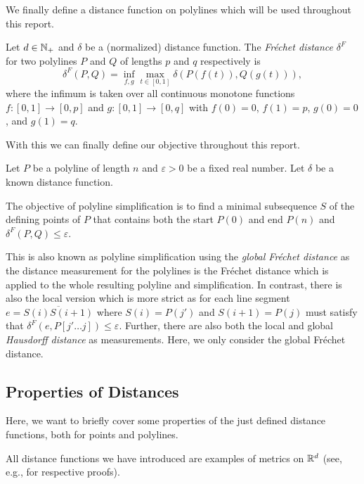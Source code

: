 We finally define a distance function on polylines which will be used throughout this report. 

\begin{definition}
  Let \(d \in \mathbb{N}_+\) and \(\delta\) be a (normalized) distance function. The \emph{Fréchet distance} \(\delta^F\) for two polylines \(P\) and \(Q\) of lengths \(p\) and \(q\) respectively is 
  \[\delta^F(P, Q) = \inf_{f,g} \max_{t \in [0,1]}\delta(P(f(t)), Q(g(t))),\]
  where the infimum is taken over all continuous monotone functions \(f:[0,1] \to [0, p]\) and \(g:[0,1] \to [0,q]\) with \(f(0) = 0\), \(f(1) = p\), \(g(0) = 0\), and \(g(1) = q\).
\end{definition}

With this we can finally define our objective throughout this report. 

\begin{definition}
  Let \(P\) be a polyline of length \(n\) and \(\varepsilon > 0\) be a fixed real number. Let \(\delta\) be a known distance function. 

  The objective of polyline simplification is to find a minimal subsequence \(S\) of the defining points of \(P\) that contains both the start \(P(0)\) and end \(P(n)\) and \(\delta^F(P, Q) \leq \varepsilon\).
\end{definition}

This is also known as polyline simplification using the \emph{global Fréchet distance} as the distance measurement for the polylines is the Fréchet distance which is applied to the whole resulting polyline and simplification. In contrast, there is also the local version which is more strict as for each line segment \(e = \overline{S(i)S(i+1)}\) where \(S(i) = P(j')\) and \(S(i+1) = P(j)\) must satisfy that \(\delta^F(e, P[j' \dots j]) \leq \varepsilon\). Further, there are also both the local and global \emph{Hausdorff distance} as measurements. Here, we only consider the global Fréchet distance.

\subsection{Properties of Distances}
Here, we want to briefly cover some properties of the just defined distance functions, both for points and polylines.

All distance functions we have introduced are examples of metrics on \(\mathbb{R}^d\) (see, e.g., \cite{metric_spaces} for respective proofs).

